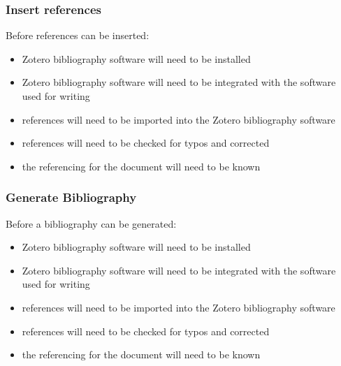 \documentclass{article}
\begin{document}
\subsubsection*{Insert references}

Before references can be inserted:
\begin{itemize}
    \item Zotero bibliography software will need to be installed
    \item Zotero bibliography software will need to be integrated with the software used for writing
    \item references will need to be imported into the Zotero bibliography software
    \item references will need to be checked for typos and corrected
    \item the referencing for the document will need to be known
\end{itemize}

\subsubsection*{Generate Bibliography}

Before a bibliography can be generated:
\begin{itemize}
    \item Zotero bibliography software will need to be installed
    \item Zotero bibliography software will need to be integrated with the software used for writing
    \item references will need to be imported into the Zotero bibliography software
    \item references will need to be checked for typos and corrected
    \item the referencing for the document will need to be known
\end{itemize}
\end{document}
